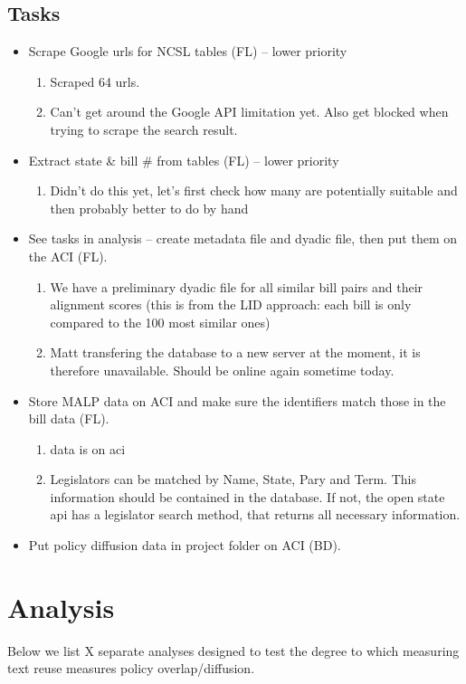 \documentclass[12pt]{article} %
\begin{document}
\subsection{Tasks}
\begin{itemize}
\item Scrape Google urls for NCSL tables (FL) -- lower priority
    \begin{enumerate}
        \item Scraped 64 urls. 
        \item Can't get around the Google API limitation yet. Also get blocked when trying to scrape the search result.
    \end{enumerate}

\item Extract state  \& bill \# from tables (FL) -- lower priority
    \begin{enumerate}
        \item Didn't do this yet, let's first check how many are potentially suitable and then probably better to do by hand
    \end{enumerate}
\item See tasks in analysis -- create metadata file and dyadic file, then put them on the ACI (FL).
    \begin{enumerate}
        \item We have a preliminary dyadic file for all similar bill pairs and their alignment scores (this is from the LID approach: each bill is only compared to the 100 most similar ones)
        \item Matt transfering the database to a new server at the moment, it is therefore unavailable. Should be online again sometime today.
    \end{enumerate}
\item Store MALP data on ACI and make sure the identifiers match those in the bill data (FL). 
    \begin{enumerate}
        \item data is on aci
        \item Legislators can be matched by Name, State, Pary and Term. This information should be contained in the database. If not, the open state api has a legislator search method, that returns all necessary information.
    \end{enumerate}
\item Put policy diffusion data in project folder on ACI (BD).
\end{itemize}

\section{Analysis}
Below we list X separate analyses designed to test the degree to which measuring text reuse measures policy overlap/diffusion. 
\end{document}
